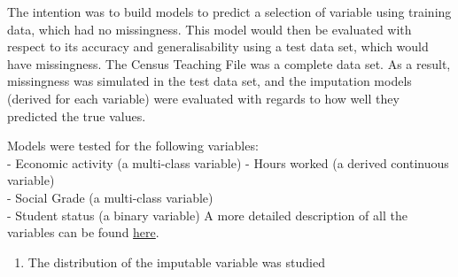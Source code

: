\documentclass[]{book}
\newenvironment{Shaded}{\begin{snugshade}}{\end{snugshade}}
\newcommand{\KeywordTok}[1]{\textcolor[rgb]{0.13,0.29,0.53}{\textbf{#1}}}
\newcommand{\DataTypeTok}[1]{\textcolor[rgb]{0.13,0.29,0.53}{#1}}
\newcommand{\DecValTok}[1]{\textcolor[rgb]{0.00,0.00,0.81}{#1}}
\newcommand{\StringTok}[1]{\textcolor[rgb]{0.31,0.60,0.02}{#1}}
\newcommand{\CommentTok}[1]{\textcolor[rgb]{0.56,0.35,0.01}{\textit{#1}}}
\newcommand{\OperatorTok}[1]{\textcolor[rgb]{0.81,0.36,0.00}{\textbf{#1}}}
\newcommand{\NormalTok}[1]{#1}
\providecommand{\tightlist}{%
  \setlength{\itemsep}{0pt}\setlength{\parskip}{0pt}}
\begin{document}
The intention was to build models to predict a selection of variable
using training data, which had no missingness. This model would then be
evaluated with respect to its accuracy and generalisability using a test
data set, which would have missingness. The Census Teaching File was a
complete data set. As a result, missingness was simulated in the test
data set, and the imputation models (derived for each variable) were
evaluated with regards to how well they predicted the true values.

Models were tested for the following variables:\\
- Economic activity (a multi-class variable) - Hours worked (a derived
continuous variable)\\
- Social Grade (a multi-class variable)\\
- Student status (a binary variable) A more detailed description of all
the variables can be found
\href{https://www.ons.gov.uk/census/2011census/2011censusdata/censusmicrodata/microdatateachingfile/variablelist}{here}.

\begin{enumerate}
\def\labelenumi{\arabic{enumi})}
\setcounter{enumi}{2}
\tightlist
\item
  The distribution of the imputable variable was studied
\end{enumerate}

\begin{Shaded}
\end{Shaded}
\end{document}
